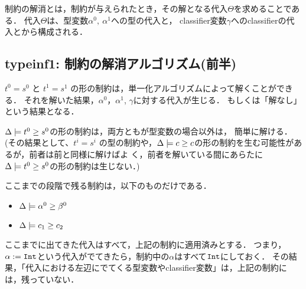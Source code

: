 制約の解消とは，制約が与えられたとき，その解となる代入$\Theta$を求めることである．
代入$\Theta$は、型変数$\alpha^0,~ \alpha^1$への型の代入と，
classifier変数$\gamma$へのclassifierの代入とから構成される．



\subsection{typeinf1: 制約の解消アルゴリズム(前半)}
$t^0=s^0$ と $t^1=s^1$ の形の制約は，単一化アルゴリズムによって解くことができる．
それを解いた結果，$\alpha^0$，$\alpha^1$, $\gamma$に対する代入が生じる．
もしくは「解なし」という結果となる．

$\Delta \models {t^0} \ge {s^0}$の形の制約は，両方ともが型変数の場合以外は，
簡単に解ける．(その結果として、$t^i=s^i$ の型の制約や，$\Delta \models
{c} \ge {c}$の形の制約を生む可能性があるが，前者は前と同様に解けばよ
く，前者を解いている間にあらたに$\Delta \models {t^0} \ge {s^0}$の形の制約は生じない．)

ここまでの段階で残る制約は，以下のものだけである．

\begin{itemize}
\item $\Delta \models {\alpha^0} \ge {\beta^0}$
\item $\Delta \models {c_1} \ge {c_2}$
\end{itemize}

ここまでに出てきた代入はすべて，上記の制約に適用済みとする．
つまり，$\alpha:=\mbox{\texttt{Int}}$という代入がでてきたら，制約中の$\alpha$はすべて$\mbox{\texttt{Int}}$にしておく．
その結果，「代入における左辺にでてくる型変数やclassifier変数」は，上記の制約には，残っていない．

